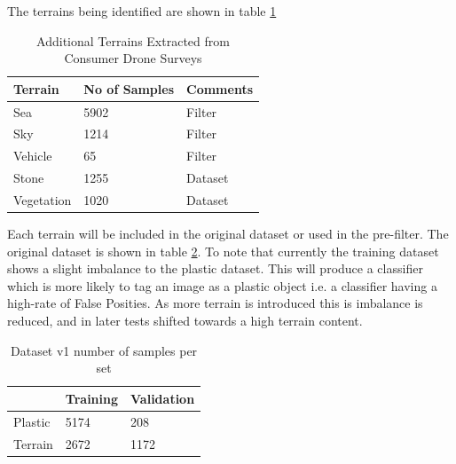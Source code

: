\documentclass{IEEEtran}
\begin{document}
The terrains being identified are shown in table \ref{table:addons}

\begin{table}[ht]
\centering
\caption{Additional Terrains Extracted from Consumer Drone Surveys}
\label{table:addons}
\begin{tabular}{lll} 
\hline
\textbf{Terrain} & \textbf{No of Samples} & \textbf{Comments}  \\ 
\hline
Sea              & 5902                   & Filter             \\
Sky              & 1214                   & Filter             \\
Vehicle          & 65                     & Filter            \\
Stone            & 1255                   & Dataset            \\
Vegetation       & 1020                   & Dataset           
\end{tabular}
\end{table}

Each terrain will be included in the original dataset or used in the pre-filter. The original dataset is shown in table \ref{table:original}. To note that currently the training dataset shows a slight imbalance to the plastic dataset. This will produce a classifier which is more likely to tag an image as a plastic object i.e. a classifier having a high-rate of False Posities. As more terrain is introduced this is imbalance is reduced, and in later tests shifted towards a high terrain content.
 
\begin{table}[ht]
\centering
\caption{Dataset v1 number of samples per set}
\label{table:original}
\begin{tabular}{lll} 
\hline
        & \textbf{Training} & \textbf{Validation}  \\ 
\hline
Plastic & 5174              & 208                  \\
Terrain & 2672              & 1172                
\end{tabular}
\end{table}
\end{document}
